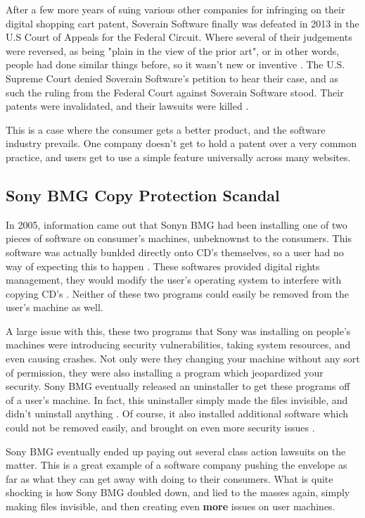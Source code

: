 \documentclass[12pt,letterpaper]{article}
\begin{document}
After a few more years of suing various other companies for infringing on their digital shopping cart patent, Soverain Software finally was defeated in 2013 in the U.S Court of Appeals for the Federal Circuit. Where several of their judgements were reversed, as being "plain in the view of the prior art", or in other words, people had done similar things before, so it wasn't new or inventive \cite{Soverain}. The U.S. Supreme Court denied Soverain Software's petition to hear their case, and as such the ruling from the Federal Court against Soverain Software stood. Their patents were invalidated, and their lawsuits were killed \cite{Soverain}.

This is a case where the consumer gets a better product, and the software industry prevails. One company doesn't get to hold a patent over a very common practice, and users get to use a simple feature universally across many websites.

\subsection{Sony BMG Copy Protection Scandal}
In 2005, information came out that Sonyn BMG had been installing one of two pieces of software on consumer's machines, unbeknownst to the consumers. This software was actually bunlded directly onto CD's themselves, so a user had no way of expecting this to happen \cite{sony}. These softwares provided digital rights management, they would modify the user's operating system to interfere with copying CD's \cite{sony}. Neither of these two programs could easily be removed from the user's machine as well.

A large issue with this, these two programs that Sony was installing on people's machines were introducing security vulnerabilities, taking system resources, and even causing crashes. Not only were they changing your machine without any sort of permission, they were also installing a program which jeopardized your security. Sony BMG eventually released an uninstaller to get these programs off of a user's machine. In fact, this uninstaller simply made the files invisible, and didn't uninstall anything \cite{sony}. Of course, it also installed additional software which could not be removed easily, and brought on even more security issues \cite{sony}.

Sony BMG eventually ended up paying out several class action lawsuits on the matter. This is a great example of a software company pushing the envelope as far as what they can get away with doing to their consumers. What is quite shocking is how Sony BMG doubled down, and lied to the masses again, simply making files invisible, and then creating even \textbf{more} issues on user machines.
\end{document}
